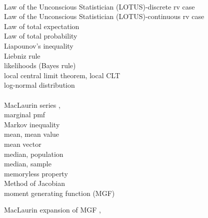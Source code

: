 \documentclass[12pt]{article}
\begin{document}
\\
\noindent Law of the Unconscious Statistician (LOTUS)-discrete rv case \pageref{lotus}\\
\noindent Law of the Unconscious Statistician (LOTUS)-continuous rv case \pageref{lotuscontinuous}\\
\noindent Law of total expectation \pageref{lawoftotalexpectation}\\
\noindent Law of total probability \pageref{lotp}\\
\noindent Liapounov's inequality \pageref{liapounov}\\
\noindent Liebniz rule \pageref{liebnizrule}\\
\noindent likelihoods (Bayes rule) \pageref{likelihoodsbayes}\\
\noindent local central limit theorem, local CLT \pageref{localCLT}\\
\noindent log-normal distribution \pageref{lognormal}\\

\\
\noindent MacLaurin series \pageref{d:maclaurinseries1}, \pageref{d:maclaurinseries}\\
\noindent marginal pmf \pageref{marginalpmf}\\
\noindent Markov inequality \pageref{markovinequality}\\
\noindent mean, mean value \pageref{mean}\\
\noindent mean vector \pageref{meanvector}\\
\noindent median, population \pageref{populationmedian}\\
\noindent median, sample \pageref{samplemedian}\\
\noindent memoryless property \pageref{memorylessexp}\\
\noindent Method of Jacobian \pageref{methodofjacobians}\\
\noindent moment generating function (MGF) \pageref{d:mgf}

MacLaurin expansion of MGF \pageref{maclaurinexpofmgf}, \pageref{maclaurinexpofmgf2}
\end{document}
